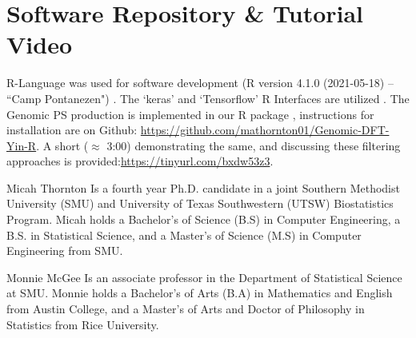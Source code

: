 \documentclass[10pt,conference]{IEEEtran}
\begin{document}
{\section{Software Repository \& Tutorial Video}

R-Language was used for software development (R version 4.1.0 (2021-05-18) -- ``Camp Pontanezen") \cite{r21}.  The `keras' and `Tensorflow' R Interfaces are utilized \cite{kerR21,tfR21}.  The Genomic PS production is implemented in our R package \cite{dftR}, instructions for installation are on Github: \url{https://github.com/mathornton01/Genomic-DFT-Yin-R}. A short ($\approx$ 3:00) demonstrating the same, and discussing these filtering approaches is provided:\url{https://tinyurl.com/bxdw53z3}.
}

\begin{IEEEbiographynophoto}{Micah Thornton}
Is a fourth year Ph.D. candidate in a joint Southern Methodist University (SMU) and University of Texas Southwestern (UTSW) Biostatistics Program.  Micah holds a Bachelor's of Science (B.S) in Computer Engineering, a B.S. in Statistical Science, and a Master's of Science (M.S) in Computer Engineering from SMU. 
\end{IEEEbiographynophoto}

\begin{IEEEbiographynophoto}{Monnie McGee} 
Is an associate professor in the Department of Statistical Science at SMU. Monnie holds a Bachelor's of Arts (B.A) in Mathematics and English from Austin College, and a Master's of Arts and Doctor of Philosophy in Statistics from Rice University.  

\end{IEEEbiographynophoto}
\end{document}
